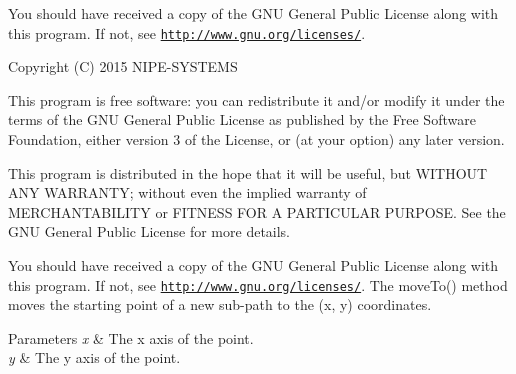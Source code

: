 You should have received a copy of the G\+N\+U General Public License along with this program. If not, see \href{http://www.gnu.org/licenses/}{\tt http\+://www.\+gnu.\+org/licenses/}.

Copyright (C) 2015 N\+I\+P\+E-\/\+S\+Y\+S\+T\+E\+M\+S

This program is free software\+: you can redistribute it and/or modify it under the terms of the G\+N\+U General Public License as published by the Free Software Foundation, either version 3 of the License, or (at your option) any later version.

This program is distributed in the hope that it will be useful, but W\+I\+T\+H\+O\+U\+T A\+N\+Y W\+A\+R\+R\+A\+N\+T\+Y; without even the implied warranty of M\+E\+R\+C\+H\+A\+N\+T\+A\+B\+I\+L\+I\+T\+Y or F\+I\+T\+N\+E\+S\+S F\+O\+R A P\+A\+R\+T\+I\+C\+U\+L\+A\+R P\+U\+R\+P\+O\+S\+E. See the G\+N\+U General Public License for more details.

You should have received a copy of the G\+N\+U General Public License along with this program. If not, see \href{http://www.gnu.org/licenses/}{\tt http\+://www.\+gnu.\+org/licenses/}. The move\+To() method moves the starting point of a new sub-\/path to the (x, y) coordinates. 
\begin{DoxyParams}{Parameters}
{\em x} & The x axis of the point. \\
\hline
{\em y} & The y axis of the point. \\
\hline
\end{DoxyParams}
